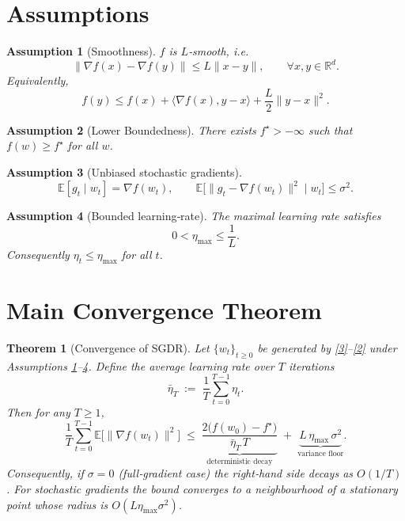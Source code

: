 \documentclass{article}
\newtheorem{theorem}{Theorem}
\newtheorem{assumption}{Assumption}
\begin{document}
\section*{Assumptions}
\begin{assumption}[Smoothness]\label{ass:smooth}
$f$ is $L$‑smooth, i.e.
\[
\|\nabla f(x)-\nabla f(y)\|\le L\|x-y\|,\qquad\forall x,y\in\mathbb{R}^d .
\]
Equivalently,
\[
f(y)\le f(x)+\langle\nabla f(x),y-x\rangle+\frac{L}{2}\|y-x\|^2 .
\tag{4}
\]
\end{assumption}
\begin{assumption}[Lower Boundedness]\label{ass:lower}
There exists $f^\star>-\infty$ such that $f(w)\ge f^\star$ for all $w$.
\end{assumption}
\begin{assumption}[Unbiased stochastic gradients]\label{ass:unbiased}
\[
\mathbb{E}[g_t\mid w_t]=\nabla f(w_t),\qquad 
\mathbb{E}\big[\|g_t-\nabla f(w_t)\|^2\mid w_t\big]\le\sigma^2 .
\tag{5}
\]
\end{assumption}
\begin{assumption}[Bounded learning‑rate]\label{ass:eta}
The maximal learning rate satisfies
\[
0<\eta_{\max}\le\frac{1}{L}.
\tag{6}
\]
Consequently $\eta_t\le\eta_{\max}$ for all $t$.
\end{assumption}

\section*{Main Convergence Theorem}
\begin{theorem}[Convergence of SGDR]\label{thm:sgdr}
Let $\{w_t\}_{t\ge0}$ be generated by \eqref{3}–\eqref{2} under Assumptions \ref{ass:smooth}–\ref{ass:eta}.  
Define the average learning rate over $T$ iterations
\[
\bar\eta_T\;:=\;\frac{1}{T}\sum_{t=0}^{T-1}\eta_t .
\]
Then for any $T\ge1$,
\[
\frac{1}{T}\sum_{t=0}^{T-1}\mathbb{E}\big[\|\nabla f(w_t)\|^2\big]
\;\le\;
\underbrace{\frac{2\big(f(w_0)-f^\star\big)}{\bar\eta_T\,T}}_{\text{deterministic decay}}
\;+\;
\underbrace{L\,\eta_{\max}\,\sigma^2}_{\text{variance floor}} .
\tag{7}
\]
Consequently, if $\sigma=0$ (full‑gradient case) the right‑hand side decays as $O(1/T)$.  For stochastic gradients the bound converges to a neighbourhood of a stationary point whose radius is $O(L\eta_{\max}\sigma^2)$.
\end{theorem}

\end{document}
